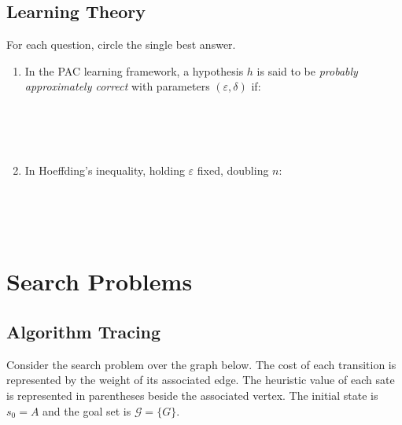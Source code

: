 \subsection{\points[2] Learning Theory}
For each question, circle the single best answer.

\begin{enumerate}

\item  \points[1] In the PAC learning framework, a hypothesis $h$ is said to be
\textit{probably approximately correct} with parameters $(\varepsilon, \delta)$ if:

 \\
 \\
 \\

\item  \points[1] In Hoeffding's inequality, holding $\varepsilon$ fixed, doubling $n$:

 \\
 \\
 \\

\end{enumerate}

\clearpage

\section{\points[12] Search Problems}

\subsection{\points[12] Algorithm Tracing}

Consider the search problem over the graph below. The cost of each transition is represented by the weight of its associated edge. The heuristic value of each sate is represented in parentheses beside the associated vertex. The initial state is $s_0 = A$ and the goal set is $\mathcal{G} = \{G\}$.

